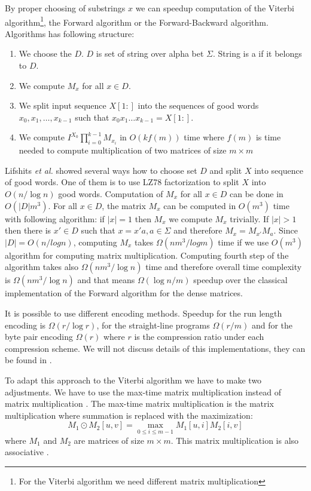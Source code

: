 By proper choosing of substrings $x$ we can speedup computation of the Viterbi
algorithm\footnote{For the Viterbi algorithm we need different matrix
multiplication}, the Forward algorithm  or the
Forward-Backward algorithm. Algorithms has following structure:
\begin{enumerate}
\item We choose the  $D$. $D$ is set of string over
alpha bet $\Sigma$. String is a
 if it belongs to $D$.
\item We compute $M_x$ for all $x\in D$.
\item We split input sequence $X[1:]$ into the sequences of good words
$x_0,x_1,\dots,x_{k-1}$ such that $x_0x_1\dots x_{k-1}=X[1:]$.
\item We compute $I^{X_0}\prod_{i=0}^{k-1}M_{x_i}$ in $O(kf(m))$ time where
$f(m)$ is time needed to compute multiplication of two matrices of size $m\times m$
\end{enumerate}

Lifshits {\it et al.} \cite{Lifshits2009} showed several ways how to choose set
$D$ and split $X$ into sequence of good words. One of them is to use LZ78 factorization
to split $X$ into $O(n/\log n)$ good words. Computation of $M_x$ for all $x\in
D$ can be done in $O(|D|m^3)$. For all $x\in D$, the matrix $M_x$ can be computed in $O(m^3)$
time with following algorithm: if $|x|=1$ then $M_x$ we compute $M_x$ trivially.
If $|x|>1$ then there is $x'\in D$ such that $x=x'a,a\in \Sigma$ and therefore $M_x =
M_{x'}M_{a}$. Since $|D|=O(n/log n)$, computing $M_x$ takes $\Omega(nm^3/log m)$
time if
we use $O(m^3)$ algorithm for computing matrix multiplication. Computing fourth
step of the algorithm takes also $\Omega(nm^3/\log n)$ time and therefore overall time complexity
is $\Omega(nm^3/\log n)$ and that means $\Omega(\log n/m)$ speedup over the
classical implementation of the Forward algorithm for the dense matrices.

It is possible to use different encoding methods. Speedup for the run length encoding 
is $\Omega(r/\log r)$, for the straight-line programs $\Omega(r/m)$ and for the
byte pair encoding $\Omega(r)$ where $r$ is the compression ratio under each
compression scheme. We will not discuss details of this implementations, they
can be found in \cite{Lifshits2009}.

To adapt this approach to the Viterbi algorithm we have to make two adjustments. 
We have to use the max-time matrix multiplication instead of matrix multiplication
\cite{Lifshits2009}. The max-time matrix multiplication is the  matrix multiplication
where summation is replaced with the maximization:
\[M_1\odot M_2 [u,v] = \max_{0\leq i\leq m-1}M_1[u,i]M_2[i,v] \]
where $M_1$ and $M_2$ are matrices of size $m\times m$. This matrix
multiplication is also associative \cite{Lifshits2009}.

